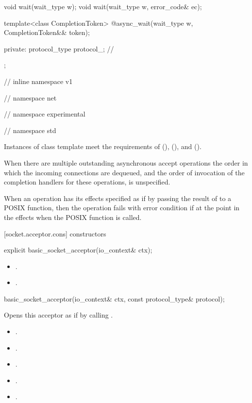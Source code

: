 \begin{codeblock}
{{{{{    void wait(wait_type w);
    void wait(wait_type w, error_code& ec);

    template<class CompletionToken>
      @\DEDUCED@ async_wait(wait_type w, CompletionToken&& token);

  private:
    protocol_type protocol_; // \expos
  };

} // inline namespace v1
} // namespace net
} // namespace experimental
} // namespace std
\end{codeblock}

\pnum
Instances of class template  meet the requirements of  (),  (), and  ().

\pnum
 When there are multiple outstanding asynchronous accept operations the order in which the incoming connections are dequeued, and the order of invocation of the completion handlers for these operations, is unspecified.

\pnum
When an operation has its effects specified as if by passing the result of  to a POSIX function, then the operation fails with error condition  if  at the point in the effects when the POSIX function is called.


[socket.acceptor.cons]{ constructors}

\begin{itemdecl}
explicit basic_socket_acceptor(io_context& ctx);
\end{itemdecl}

\begin{itemdescr}
\pnum
\postconditions 
\begin{itemize}
\item
{}.
\item
{}.
\end{itemize}
\end{itemdescr}

\begin{itemdecl}
basic_socket_acceptor(io_context& ctx, const protocol_type& protocol);
\end{itemdecl}

\begin{itemdescr}
\pnum
\effects Opens this acceptor as if by calling .

\pnum
\postconditions 
\begin{itemize}
\item
{}.
\item
{}.
\item
{}.
\item
{}.
\item
{}.
\end{itemize}
\end{itemdescr}


